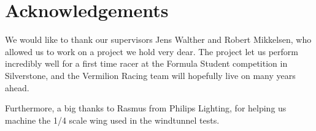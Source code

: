 \chapter*{Acknowledgements}

We would like to thank our supervisors Jens Walther and Robert Mikkelsen, who allowed us to work on a project we hold very dear. The project let us perform incredibly well for a first time racer at the Formula Student competition in Silverstone, and the Vermilion Racing team will hopefully live on many years ahead.

Furthermore, a big thanks to Rasmus from Philips Lighting, for helping us machine the 1/4 scale wing used in the windtunnel tests.
